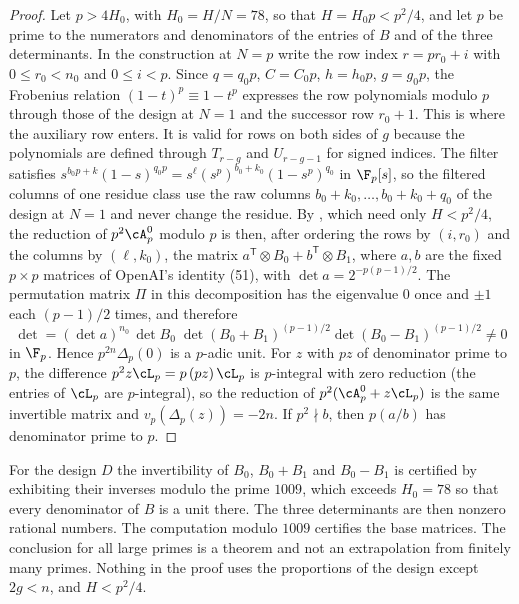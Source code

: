 \begin{proof}
Let $p>4H_0$, with $H_0=H/N=78$, so that $H=H_0p<p^2/4$, and let $p$ be prime to the numerators and denominators
of the entries of $B$ and of the three determinants. In the construction at $N=p$ write the row index
$r=pr_0+i$ with $0\le r_0<n_0$ and $0\le i<p$. Since $q=q_0p$, $C=C_0p$, $h=h_0p$, $g=g_0p$, the Frobenius
relation $(1-t)^{p}\equiv1-t^p$ expresses the row polynomials modulo $p$ through those of the design at
$N=1$ and the successor row $r_0+1$. This is where the auxiliary row enters. It is valid for rows on
both sides of $g$ because the polynomials are defined through $T_{r-g}$ and $U_{r-g-1}$ for signed
indices. The filter satisfies $s^{b_0p+k}(1-s)^{q_0p}=s^{\ell}(s^p)^{b_0+k_0}(1-s^p)^{q_0}$ in $\F_p[s]$, so
the filtered columns of one residue class use the raw columns $b_0+k_0,\dots,b_0+k_0+q_0$ of the design at
$N=1$ and never change the residue. By \cite[Lemma~3.1 and eqs.~(31), (35), (36)]{OpenAI2026}, which
need only $H<p^2/4$, the reduction of $p^2\cA^0_p$ modulo $p$ is then, after ordering the rows by $(i,r_0)$ and
the columns by $(\ell,k_0)$, the matrix $a^{\mathsf T}\otimes B_0+b^{\mathsf T}\otimes B_1$, where $a,b$ are the
fixed $p\times p$ matrices of OpenAI's identity (51), with $\det a=2^{-p(p-1)/2}$. The permutation
matrix $\Pi$ in this decomposition has the eigenvalue $0$ once and $\pm1$ each $(p-1)/2$ times, and
therefore
\[
 \det=(\det a)^{n_0}\,\det B_0\;\det(B_0+B_1)^{(p-1)/2}\det(B_0-B_1)^{(p-1)/2}\ne0
\]
in $\F_p$. Hence $p^{2n}\Delta_p(0)$ is a $p$-adic unit. For $z$ with $pz$ of denominator prime to $p$, the
difference $p^2z\cL_p=p\,(pz)\,\cL_p$ is $p$-integral with zero reduction (the entries of $\cL_p$ are
$p$-integral), so the reduction of $p^2(\cA^0_p+z\cL_p)$ is the same invertible matrix and
$v_p(\Delta_p(z))=-2n$. If $p^2\nmid b$, then $p(a/b)$ has denominator prime to $p$.
\end{proof}

For the design $D$ the invertibility of $B_0$, $B_0+B_1$ and $B_0-B_1$ is certified by exhibiting their
inverses modulo the prime $1009$, which exceeds $H_0=78$ so that every denominator of $B$ is a unit
there. The three determinants are then nonzero rational numbers. The computation modulo $1009$ certifies
the base matrices. The conclusion for all large primes is a theorem and not an extrapolation from
finitely many primes. Nothing in the proof uses the proportions of the design except $2g<n$, and $H<p^2/4$.
